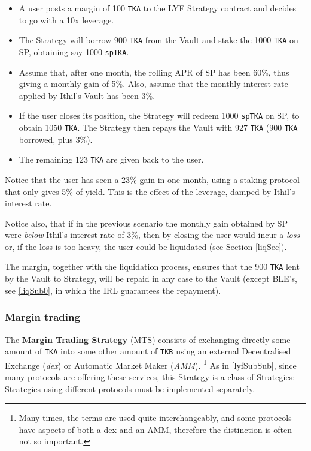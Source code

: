\documentclass[a4paper,10 pt]{article}
\theoremstyle{definition}
\begin{document}
\begin{itemize}
\item A user posts a margin of 100 \verb|TKA| to the LYF Strategy contract and decides to go with a 10x leverage.
\item The Strategy will borrow 900 \verb|TKA| from the Vault and stake the 1000 \verb|TKA| on SP, obtaining say 1000 \verb|spTKA|.
\item Assume that, after one month, the rolling APR of SP has been 60\%, thus giving a monthly gain of 5\%. Also, assume that the monthly interest rate applied by Ithil's Vault has been 3\%.
\item If the user closes its position, the Strategy will redeem 1000 \verb|spTKA| on SP, to obtain 1050 \verb|TKA|. The Strategy then repays the Vault with 927 \verb|TKA| (900 \verb|TKA| borrowed, plus 3\%). 
\item The remaining 123 \verb|TKA| are given back to the user.
\end{itemize}
 Notice that the user has seen a 23\% gain in one month, using a staking protocol that only gives 5\% of yield. This is the effect of the leverage, damped by Ithil's interest rate.

Notice also, that if in the previous scenario the monthly gain obtained by SP were {\it below} Ithil's interest rate of $3\%$, then by closing the user would incur a {\it loss} or, if the loss is too heavy, the user could be liquidated (see Section \ref{liqSec}).

The margin, together with the liquidation process, ensures that the $900$ \verb|TKA| lent by the Vault to Strategy, will be repaid in any case to the Vault (except BLE's, see \ref{liqSub0}, in which the IRL guarantees the repayment).

\subsubsection{Margin trading}\label{mtSubSub}

The {\bf Margin Trading Strategy} (MTS) consists of exchanging directly some amount of \verb|TKA| into some other amount of \verb|TKB| using an external Decentralised Exchange ({\it dex}) or Automatic Market Maker ({\it AMM}). \footnote{Many times, the terms are used quite interchangeably, and some protocols have aspects of both a dex and an AMM, therefore the distinction is often not so important.}  As in \ref{lyfSubSub}, since many protocols are offering these services, this Strategy is a class of Strategies: Strategies using different protocols must be implemented separately.
\end{document}

